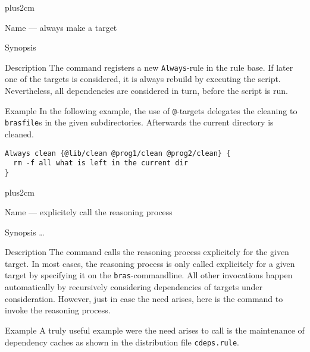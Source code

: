 \documentclass[12pt]{article}
\newcommand{\bras}{\texttt{bras}}
\newcommand{\brasfile}{\texttt{brasfile}}
\begin{document}
\newenvironment{Describe}
{\vskip0pt plus2cm\begin{list}{}{\renewcommand{\makelabel}{\Sflabel}}}
{\end{list}\pagebreak[2]}

\begin{Describe}
\item[Name]  --- always make a target
\item[Synopsis]    
\item[Description] The command registers a new \texttt{Always}-rule in
  the rule base. If later one of the targets is considered, it is always
  rebuild by executing the script. Nevertheless, all dependencies are
  considered in turn, before the script is run.
\item[Example]
In the following example, the use of \texttt{@}-targets delegates the
cleaning to \brasfile{}s in the given subdirectories. Afterwards the
current directory is cleaned.
\begin{verbatim}
Always clean {@lib/clean @prog1/clean @prog2/clean} {
  rm -f all what is left in the current dir
}
\end{verbatim}
\end{Describe}

\begin{Describe}
\item[Name]  --- explicitely call the reasoning
  process 
\item[Synopsis]   \ldots
\item[Description] The command calls the reasoning process
  explicitely for the given target. In most cases, the reasoning
  process is only called explicitely for a given target by specifying
  it on the \bras-commandline. All other invocations happen
  automatically by recursively considering dependencies of targets
  under consideration. However, just in case the need arises, here is
  the command to invoke the reasoning process.
\item[Example] A truly useful example were the need arises to call
   is the maintenance of dependency caches as shown in
  the distribution file \texttt{cdeps.rule}.
\end{Describe}
\end{document}
